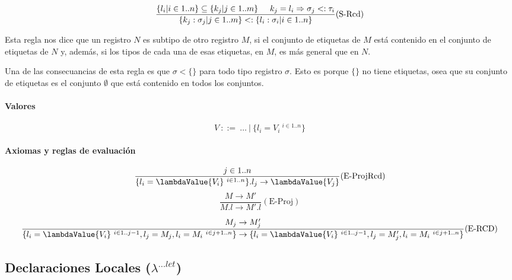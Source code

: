 \begin{equation*}
	\frac{\{l_i| i\in 1..n\}\subseteq\{k_j|j\in 1..m\} \hspace*{5mm} k_j = l_i\Rightarrow \sigma_j <: \tau_i}{\{k_j:\sigma_j|j\in 1..m\} <: \{l_i:\sigma_i| i\in 1..n\}}(\text{S-Rcd})
\end{equation*}

\vspace*{5mm}
Esta regla nos dice que un registro \(N\) es subtipo de otro registro \(M\), si el conjunto de etiquetas de \(M\) está contenido en el conjunto de etiquetas de \(N\) y, además, si los tipos de cada una de esas etiquetas, en \(M\), es más general que en \(N\).

Una de las consecuancias de esta regla es que  \(\sigma <\{\}\) para todo tipo registro \(\sigma\). Esto es porque \(\{\}\) no tiene etiquetas, osea que su conjunto de etiquetas es el conjunto \(\emptyset\) que está contenido en todos los conjuntos.
\paragraph{Valores}
\[V~::=~\dots~|~\{l_i = V_i ~^{i\in 1..n}\}\]


\paragraph{Axiomas y reglas de evaluación}

\begin{equation*}
	\frac{j\in 1..n}{\{l_i = \lambdaValue{V_i} ~^{i\in 1..n}\}.l_j \to \lambdaValue{V_j}}(\text{E-ProjRcd})
\end{equation*}
\vspace*{5mm}
\begin{equation*}
	\frac{M \to M'}{M.l \to M'.l}(\text{E-Proj})
\end{equation*}

\vspace*{5mm}
\begin{equation*}
	\frac{M_j\to M_j'}{\{l_i = \lambdaValue{V_i}~^{i\in 1..j-1}, l_j = M_j, l_i = M_i ~^{i\in j+1..n}\} \to \{l_i = \lambdaValue{V_i}~^{i\in 1..j-1}, l_j = M'_j, l_i = M_i ~^{i\in j+1..n}\}}(\text{E-RCD})
\end{equation*}
\vspace*{5mm}
\subsection{Declaraciones Locales (\texorpdfstring{\(\lambda^{...let}\)}{lambda ...let})}\label{extension_lambda:let}

